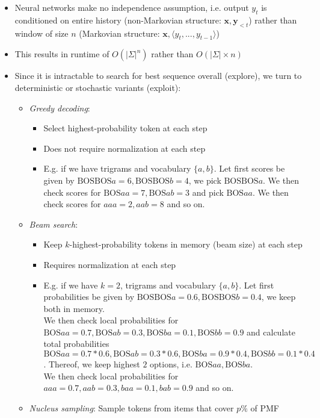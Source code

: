 \begin{itemize}
    \begin{itemize}
        \item Neural networks make no independence assumption, i.e. output $y_t$ is conditioned on entire history (non-Markovian structure: $\boldsymbol{x},\boldsymbol{y}_{<t}$) rather than window of size $n$ (Markovian structure: $\boldsymbol{x},\langle y_t, ..., y_{t-1} \rangle$)
        \item This results in runtime of $O(|\Sigma|^n)$ rather than $O(|\Sigma| \times n)$
        \item Since it is intractable to search for best sequence overall (explore), we turn to deterministic or stochastic variants (exploit): 
        \begin{itemize}
            \item \emph{Greedy decoding}: 
            \begin{itemize}
                \item Select highest-probability token at each step
                \item Does not require normalization at each step
                \item E.g. if we have trigrams and vocabulary $\{a,b\}$. Let first scores be given by $\textrm{BOS}\textrm{BOS}a = 6, \textrm{BOS}\textrm{BOS}b = 4$, we pick $\textrm{BOS}\textrm{BOS}a$. We then check scores for $\textrm{BOS}aa = 7, \textrm{BOS}ab = 3$ and pick $\textrm{BOS}aa$. We then check scores for $aaa = 2, aab = 8$ and so on. 
            \end{itemize}
            \item \emph{Beam search}: 
            \begin{itemize}
                \item Keep $k$-highest-probability tokens in memory (beam size) at each step
                \item Requires normalization at each step
                \item E.g. if we have $k=2$, trigrams and vocabulary $\{a,b\}$. Let first probabilities be given by $\textrm{BOS}\textrm{BOS}a = 0.6, \textrm{BOS}\textrm{BOS}b = 0.4$, we keep both in memory.\\
                We then check local probabilities for $\textrm{BOS}aa = 0.7, \textrm{BOS}ab = 0.3, \textrm{BOS}ba = 0.1, \textrm{BOS}bb = 0.9$ and calculate total probabilities $\textrm{BOS}aa = 0.7 * 0.6, \textrm{BOS}ab = 0.3 * 0.6, \textrm{BOS}ba = 0.9 * 0.4, \textrm{BOS}bb = 0.1 * 0.4$. Thereof, we keep highest $2$ options, i.e. $\textrm{BOS}aa, \textrm{BOS}ba$.\\
                We then check local probabilities for $aaa = 0.7, aab = 0.3, baa = 0.1, bab = 0.9$ and so on. 
            \end{itemize}
            \item \emph{Nucleus sampling}: Sample tokens from items that cover $p\%$ of PMF
        \end{itemize}
    \end{itemize}
\end{itemize}
